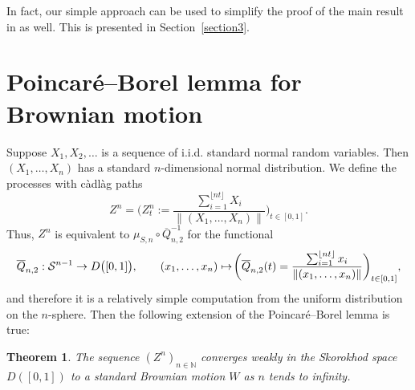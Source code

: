 \documentclass[numbers,compress,v1.0.1]{vmsta}
\newtheorem{theorem}{Theorem}
\theoremstyle{definition}
\def\N{\mathbb{N}}
\newcommand\cadlag{c\`adl\`ag }
\begin{document}
In fact, our simple approach can be used to simplify the proof of the
main result in \cite{Csorgo} as well. This is presented in Section~\ref{section3}.

\section{Poincar\'{e}--Borel lemma for Brownian motion}\label{section1}

Suppose $X_1, X_2, \ldots$ is a sequence of i.i.d. standard normal
random variables. Then $(X_1,\ldots, X_n)$ has a standard
$n$-dimensional normal distribution. We define the processes with
\cadlag paths
%
\[
Z^n = \biggl(Z^n_t := \frac{\sum_{i=1}^{\lfloor nt \rfloor}X_i}{\|
(X_1,\ldots, X_n)\|}
\biggr)_{t \in[0,1]}.
\]
%
Thus, $Z^n$ is equivalent to $\mu_{S,n} \circ\overline{Q}_{n,2}^{-1}$
for the functional
%
\[
\overline{Q}_{n,2}: \mathcal{S}^{n-1} \rightarrow D\bigl([0,1]\bigr),
\qquad
(x_1,\ldots, x_n) \mapsto\! \xch{\biggl(\overline{Q}_{n,2}(t) = \frac{\sum_{i=1}^{\lfloor nt \rfloor} x_i}{\|(x_1,\ldots, x_n)\|} \biggr)_{t \in[0,1]},}%
{\biggl(\overline{Q}_{n,2}(t) = \frac{\sum_{i=1}^{\lfloor nt \rfloor} x_i}{\|(x_1,\ldots, x_n)\|} \biggr)_{t \in[0,1]}}
\]
%
and therefore it is a relatively simple computation from the uniform
distribution on the $n$-sphere. Then the following extension of the
Poincar\'{e}--Borel lemma is true:
%
\begin{theorem}\label{thm:Poincare_Bm}
The sequence $(Z^n)_{n \in\N}$ converges weakly in the Skorokhod space\break
$D([0,1])$ to a standard Brownian motion $W$ as $n$ tends to infinity.
\end{theorem}
\end{document}
